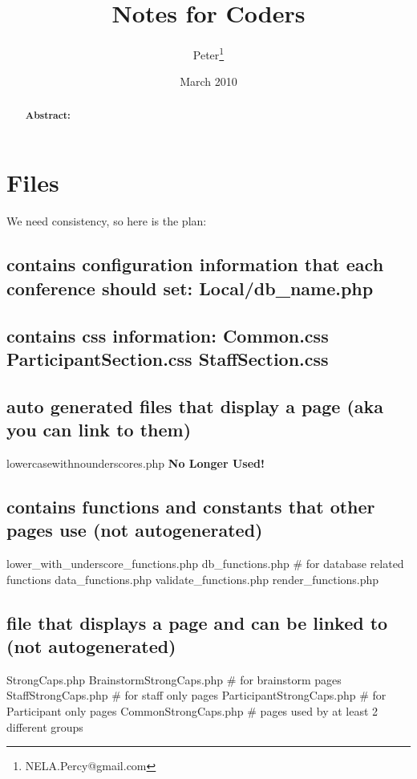 \documentclass[captions=tablesignature]{scrartcl}
\author{Peter\thanks{NELA.Percy@gmail.com}}
\date{March 2010}
\title{Notes for Coders}
\begin{document}
\maketitle
{}
\thispagestyle{fancy}
\renewcommand{\headrulewidth}{0pt}
\renewcommand{\footrulewidth}{0pt}
\lhead{}
\rhead{}
\chead{}
\lfoot{}
\cfoot{}
\rfoot{}
\begin{abstract}
\vspace{5cm}
{\LARGE{\textbf{Abstract:\\}}}

\end{abstract}
\newpage
\renewcommand{\headrulewidth}{1pt}
\renewcommand{\footrulewidth}{1pt}
\rfoot{\thepage}
\setcounter{tocdepth}{3}
\tableofcontents
\newpage
{}
\section{Files}
\label{sec-1}
We need consistency, so here is the plan:
\subsection{contains configuration information that each conference should set: Local/db\_name.php}
\label{sec-1-1}

\subsection{contains css information: Common.css  ParticipantSection.css  StaffSection.css}
\label{sec-1-2}

\subsection{auto generated files that display a page (aka you can link to them)}
\label{sec-1-3}
lowercasewithnounderscores.php
\textbf{No Longer Used!}
\subsection{contains functions and constants that other pages use (not autogenerated)}
\label{sec-1-4}
lower\_with\_underscore\_functions.php
db\_functions.php           \# for database related functions
data\_functions.php
validate\_functions.php
render\_functions.php
\subsection{file that displays a page and can be linked to  (not autogenerated)}
\label{sec-1-5}
StrongCaps.php
BrainstormStrongCaps.php    \# for brainstorm pages
StaffStrongCaps.php    \# for staff only pages
ParticipantStrongCaps.php    \# for Participant only pages
CommonStrongCaps.php    \# pages used by at least 2 different groups
\end{document}
